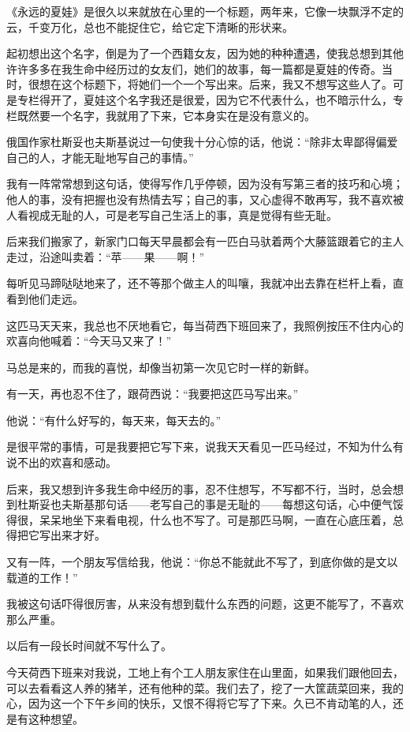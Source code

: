 \par 《永远的夏娃》是很久以来就放在心里的一个标题，两年来，它像一块飘浮不定的云，千变万化，总也不能捉住它，给它定下清晰的形状来。
\par 起初想出这个名字，倒是为了一个西籍女友，因为她的种种遭遇，使我总想到其他许许多多在我生命中经历过的女友们，她们的故事，每一篇都是夏娃的传奇。当时，很想在这个标题下，将她们一个一个写出来。后来，我又不想写这些人了。可是专栏得开了，夏娃这个名字我还是很爱，因为它不代表什么，也不暗示什么，专栏既然要一个名字，我就用了下来，它本身实在是没有意义的。
\par 俄国作家杜斯妥也夫斯基说过一句使我十分心惊的话，他说：“除非太卑鄙得偏爱自己的人，才能无耻地写自己的事情。”
\par 我有一阵常常想到这句话，使得写作几乎停顿，因为没有写第三者的技巧和心境；他人的事，没有把握也没有热情去写；自己的事，又心虚得不敢再写，我不喜欢被人看视成无耻的人，可是老写自己生活上的事，真是觉得有些无耻。
\par 后来我们搬家了，新家门口每天早晨都会有一匹白马驮着两个大藤篮跟着它的主人走过，沿途叫卖着：“苹——果——啊！”
\par 每听见马蹄哒哒地来了，还不等那个做主人的叫嚷，我就冲出去靠在栏杆上看，直看到他们走远。
\par 这匹马天天来，我总也不厌地看它，每当荷西下班回来了，我照例按压不住内心的欢喜向他喊着：“今天马又来了！”
\par 马总是来的，而我的喜悦，却像当初第一次见它时一样的新鲜。
\par 有一天，再也忍不住了，跟荷西说：“我要把这匹马写出来。”
\par 他说：“有什么好写的，每天来，每天去的。”
\par 是很平常的事情，可是我要把它写下来，说我天天看见一匹马经过，不知为什么有说不出的欢喜和感动。
\par 后来，我又想到许多我生命中经历的事，忍不住想写，不写都不行，当时，总会想到杜斯妥也夫斯基那句话——老写自己的事是无耻的——每想这句话，心中便气馁得很，呆呆地坐下来看电视，什么也不写了。可是那匹马啊，一直在心底压着，总得把它写出来才好。
\par 又有一阵，一个朋友写信给我，他说：“你总不能就此不写了，到底你做的是文以载道的工作！”
\par 我被这句话吓得很厉害，从来没有想到载什么东西的问题，这更不能写了，不喜欢那么严重。
\par 以后有一段长时间就不写什么了。
\par 今天荷西下班来对我说，工地上有个工人朋友家住在山里面，如果我们跟他回去，可以去看看这人养的猪羊，还有他种的菜。我们去了，挖了一大筐蔬菜回来，我的心，因为这一个下午乡间的快乐，又恨不得将它写了下来。久已不肯动笔的人，还是有这种想望。
